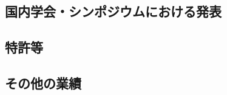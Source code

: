 \subsection{国内学会・シンポジウムにおける発表}
\newcommand{\国内学会やシンポジウムにおける発表}{%

	(以下1件　査読なし・口頭発表)
	\begin{enumerate}
		\item \underline{$\circ$ 栁裕太}、田原康之、大須賀昭彦、清雄一\\
			「画像付きフェイクニュースとジョークニュースの検出・分類に向けた機械学習モデルの検討」、\\
			日本ソフトウェア科学会 2018年度 MACC研究発表会、
			大分、2019年3月
	\end{enumerate}

	(以下1件　査読なし・ポスター発表)
	\begin{enumerate}
		\item \underline{$\circ$ 栁裕太}、葛西透麿、 森谷薫平、神谷岳洋、藤原徹、木村健太、榎本裕介\\
			「CaD428の変異遺伝子の機能解析ツールの汎用化」、\\
			広尾学園高校医進・サイエンスコース研究成果報告会、
			東京、2015年3月
	\end{enumerate}
}

\subsection{特許等}
\newcommand{\特許等}{%

	なし
}

\subsection{その他の業績}
\newcommand{\その他の業績}{%

プレプリント論文

7月開催の国際学会INESに投稿中、採録なら(3)に移管予定

一応通知は5月4日だけどコロナでオンライン開催になるらしいです、ぶっ飛ばずに済んだ……
	\begin{enumerate}
		\item \underline{$\circ$ Yuta Yanagi}, Ryouhei Orihara, Yuichi Sei, Yasuyuki Tahara, and Akihiko Ohsuga.\\
		``Fake news detection with generated comments for news articles''.
		EasyChair Preprint no. 3190, EasyChair, 2020.

	\end{enumerate}
}

